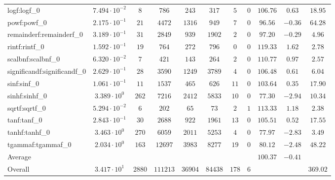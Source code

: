 \begin{tabular}{|l|c|c|c|c|c|c|c|c|c|c|}
logf:logf\_0                 & $ 7.494 \cdot 10^{-2} $ & $ 8      $ & $ 786    $ & $ 243   $ & $ 317   $ & $ 5   $ & $ 0 $ & $ 106.76      $ & $ 0.63    $ & $ 18.95   $ \\
powf:powf\_0                 & $ 2.175 \cdot 10^{-1} $ & $ 21     $ & $ 4472   $ & $ 1316  $ & $ 949   $ & $ 7   $ & $ 0 $ & $ 96.56       $ & $ -0.36   $ & $ 64.28   $ \\
remainderf:remainderf\_0     & $ 3.189 \cdot 10^{-1} $ & $ 31     $ & $ 2849   $ & $ 939   $ & $ 1902  $ & $ 2   $ & $ 0 $ & $ 97.20       $ & $ -0.29   $ & $ 4.96    $ \\
rintf:rintf\_0               & $ 1.592 \cdot 10^{-1} $ & $ 19     $ & $ 764    $ & $ 272   $ & $ 796   $ & $ 0   $ & $ 0 $ & $ 119.33      $ & $ 1.62    $ & $ 2.78    $ \\
scalbnf:scalbnf\_0           & $ 6.320 \cdot 10^{-2} $ & $ 7      $ & $ 421    $ & $ 143   $ & $ 264   $ & $ 2   $ & $ 0 $ & $ 110.77      $ & $ 0.97    $ & $ 2.57    $ \\
significandf:significandf\_0 & $ 2.629 \cdot 10^{-1} $ & $ 28     $ & $ 3590   $ & $ 1249  $ & $ 3789  $ & $ 4   $ & $ 0 $ & $ 106.48      $ & $ 0.61    $ & $ 6.04    $ \\
sinf:sinf\_0                 & $ 1.061 \cdot 10^{-1} $ & $ 11     $ & $ 1537   $ & $ 465   $ & $ 626   $ & $ 11  $ & $ 0 $ & $ 103.64      $ & $ 0.35    $ & $ 17.90   $ \\
sinhf:sinhf\_0               & $ 3.389 \cdot 10^{0}  $ & $ 262    $ & $ 7216   $ & $ 2412  $ & $ 5833  $ & $ 10  $ & $ 0 $ & $ 77.30       $ & $ -2.94   $ & $ 10.34   $ \\
sqrtf:sqrtf\_0               & $ 5.294 \cdot 10^{-2} $ & $ 6      $ & $ 202    $ & $ 65    $ & $ 73    $ & $ 2   $ & $ 1 $ & $ 113.33      $ & $ 1.18    $ & $ 2.38    $ \\
tanf:tanf\_0                 & $ 2.843 \cdot 10^{-1} $ & $ 30     $ & $ 2688   $ & $ 922   $ & $ 1961  $ & $ 13  $ & $ 0 $ & $ 105.51      $ & $ 0.52    $ & $ 17.55   $ \\
tanhf:tanhf\_0               & $ 3.463 \cdot 10^{0}  $ & $ 270    $ & $ 6059   $ & $ 2011  $ & $ 5253  $ & $ 4   $ & $ 0 $ & $ 77.97       $ & $ -2.83   $ & $ 3.49    $ \\
tgammaf:tgammaf\_0           & $ 2.034 \cdot 10^{0}  $ & $ 163    $ & $ 12697  $ & $ 3983  $ & $ 8277  $ & $ 19  $ & $ 0 $ & $ 80.12       $ & $ -2.48   $ & $ 48.22   $ \\
\hline
Average                      & $                     $ & $        $ & $        $ & $       $ & $       $ & $     $ & $   $ & $ 100.37      $ & $ -0.41   $ & $         $ \\
\hline
Overall                      & $ 3.417 \cdot 10^{1}  $ & $ 2880   $ & $ 111213 $ & $ 36904 $ & $ 84438 $ & $ 178 $ & $ 6 $ & $             $ & $         $ & $ 369.02  $ \\
\hline
\end{tabular}
